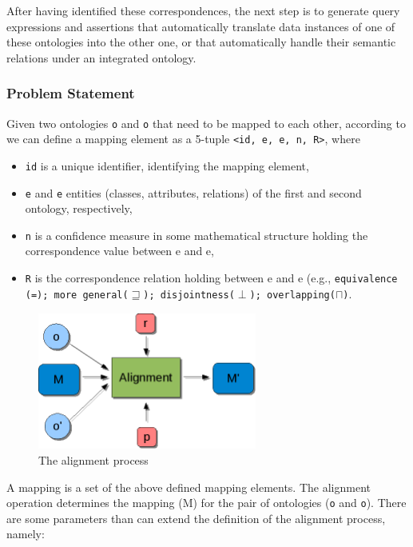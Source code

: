 After having identified these correspondences, the next step is to
generate query expressions and assertions that automatically translate
data instances of one of these ontologies into the other one, or that
automatically handle their semantic relations under an integrated
ontology. 

\subsubsection{Problem Statement}
\label{subsec:mediationproblem_problemstatement}
Given two ontologies \texttt{o} and
\texttt{o{\textquotesingle}} that need to be mapped to
each other, according to \cite{shvaiko2005schema_based} we can define a
mapping element as a 5-tuple \texttt{{\textless}id, e,
e{\textquotesingle}, n, R{\textgreater}}, where 

\begin{itemize}
\item \texttt{id} is a unique identifier, identifying the
mapping element, 
\item \texttt{e} and
\texttt{e{\textquotesingle}} entities (classes,
attributes, relations) of the first and second ontology, respectively, 
\item \texttt{n} is a confidence measure in some
mathematical structure holding the correspondence value between e and
e{\textquotesingle}, 
\item \texttt{R} is the correspondence relation holding
between e and e{\textquotesingle} (e.g.,
\texttt{equivalence (=); more general($\sqsupseteq$); disjointness($\perp$); overlapping($\sqcap$)}.
\end{itemize}

\begin{figure}
    \centering
        \includegraphics[width=72mm, height=45mm]{images/Alignment_process.png}%
        \caption{The alignment process}
    \label{fig:Alignment}
\end{figure}

A mapping is a set of the above defined mapping elements. The alignment
operation determines the mapping
(M\texttt{{\textquotesingle}}) for the pair of ontologies
(\texttt{o} and
\texttt{o{\textquotesingle}}). There are some parameters
than can extend the definition of the alignment process, namely: 

